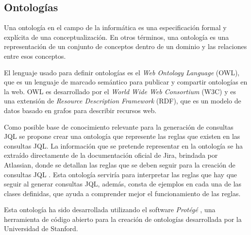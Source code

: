 \subsection{Ontologías}
Una ontología en el campo de la informática es una especificación formal y explícita de una conceptualización. En otros términos, una ontología es una representación de un conjunto de conceptos dentro de un dominio y las relaciones entre esos conceptos. 

El lenguaje usado para definir ontologías es el \textit{Web Ontology Language} (OWL), que es un lenguaje de marcado semántico para publicar y compartir ontologías en la web. OWL es desarrollado por el \textit{World Wide Web Consortium} (W3C) y es una extensión de \textit{Resource Description Framework} (RDF), que es un modelo de datos basado en grafos para describir recursos web.

Como posible base de conocimiento relevante para la generación de consultas JQL se propone crear una ontología que represente las reglas que existen en las consultas JQL. La información que se pretende representar en la ontología se ha extraído directamente de la documentación oficial de Jira, brindada por Atlassian, donde se detallan las reglas que se deben seguir para la creación de consultas JQL \cite{jiradocs}. Esta ontología serviría para interpretar las reglas que hay que seguir al generar consultas JQL, además, consta de ejemplos en cada una de las clases definidas, que ayuda a comprender mejor el funcionamiento de las reglas.

Esta ontología ha sido desarrollada utilizando el software \textit{Protégé} \cite{protege}, una herramienta de código abierto para la creación de ontologías desarrollada por la Universidad de Stanford.